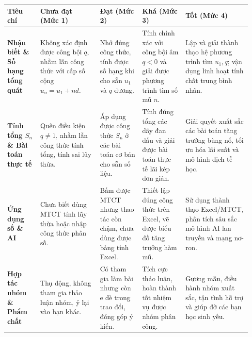 \documentclass[12pt, a4paper]{article}
\begin{document}
\begin{center}
\small
\begin{tabularx}{\textwidth}{|p{2.8cm}|X|X|X|X|}
\hline
\textbf{Tiêu chí} & \textbf{Chưa đạt (Mức 1)} & \textbf{Đạt (Mức 2)} & \textbf{Khá (Mức 3)} & \textbf{Tốt (Mức 4)} \\ \hline
\textbf{Nhận biết \& Số hạng tổng quát} & Không xác định được công bội $q$, nhầm lẫn công thức với cấp số cộng $u_n = u_1 + nd$. & Nhớ đúng công thức, tính được số hạng khi cho sẵn $u_1$ và $q$ dương. & Tính chính xác với công bội âm $q < 0$ và giải được phương trình tìm số mũ $n$. & Lập và giải thành thạo hệ phương trình tìm $u_1, q$; vận dụng linh hoạt tính chất trung bình nhân. \\ \hline
\textbf{Tính tổng $S_n$ \& Bài toán thực tế} & Quên điều kiện $q \neq 1$, nhầm lẫn công thức tính tổng, tính sai lũy thừa. & Áp dụng được công thức $S_n$ ở các bài toán cơ bản cho sẵn số liệu. & Tính đúng tổng các dãy đan dấu và giải được bài toán thực tế lãi kép đơn giản. & Giải quyết xuất sắc các bài toán tăng trưởng bùng nổ, tối ưu hóa lãi suất và mô hình dịch tễ học. \\ \hline
\textbf{Ứng dụng số \& AI} & Chưa biết dùng MTCT tính lũy thừa hoặc nhập công thức phân số. & Bấm được MTCT nhưng thao tác còn chậm, chưa dùng được bảng tính Excel. & Thiết lập đúng công thức trên Excel, vẽ được biểu đồ tăng trưởng hàm mũ. & Sử dụng thành thạo Excel/MTCT, phân tích sâu sắc mô hình AI lan truyền và mạng nơ-ron. \\ \hline
\textbf{Hợp tác nhóm \& Phẩm chất} & Thụ động, không tham gia thảo luận nhóm, ỷ lại vào bạn khác. & Có tham gia làm bài nhưng còn e dè trong trao đổi, đóng góp ý kiến. & Tích cực thảo luận, hoàn thành tốt nhiệm vụ được nhóm phân công. & Gương mẫu, điều hành nhóm xuất sắc, tận tình hỗ trợ và giúp đỡ các bạn học sinh yếu. \\ \hline
\end{tabularx}
\end{center}
\end{document}
